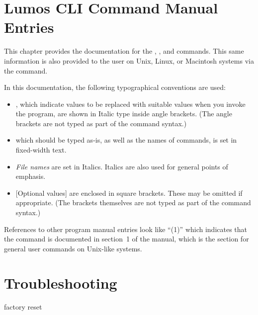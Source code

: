 \documentclass[letterpaper,twoside,onecolumn,openright,final]{memoir}
\begin{document}
\chapter{Lumos CLI Command Manual Entries}\label{ch:lumosctl}
This chapter provides the documentation for the , , and  commands.  
This same information is also
provided to the  user on Unix, Linux, or Macintosh systems via the  command.  

In this documentation, the following typographical conventions are used:
\begin{itemize}
	\item	{}, which indicate values to be replaced with suitable values when you
		invoke the program, are shown in Italic type inside angle brackets.  (The angle brackets
		are not typed as part of the command syntax.)
	\item	{} which should be typed as-is, as well as the names of commands, is set
		in fixed-width text.
	\item	\emph{File names} are set in Italics.  Italics are also used for general points of emphasis.
	\item	{}[Optional values] are enclosed in square brackets.  These may be omitted if appropriate.
		(The brackets themselves are not typed as part of the command syntax.)
\end{itemize}
References to other program manual entries look like ``(1)'' which indicates that the
 command is documented in section~1 of the manual, which is the section for general 
user commands on Unix-like systems.
\newpage

\newpage

\newpage
\label{man:lumosupgrade}

\chapter{Troubleshooting}
factory reset
\end{document}
